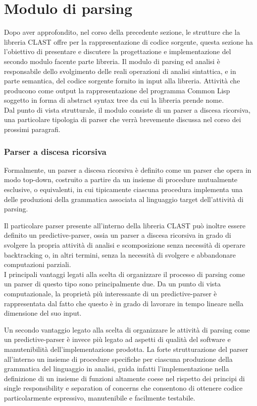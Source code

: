 \section{Modulo di parsing}

Dopo aver approfondito, nel corso della precedente sezione, le strutture che
la libreria CLAST offre per la rappresentazione di codice sorgente, questa
sezione ha l’obiettivo di presentare e discutere la progettazione e
implementazione del secondo modulo facente parte libreria. Il modulo di
parsing ed analisi è responsabile dello svolgimento delle reali operazioni di
analisi sintattica, e in parte semantica, del codice sorgente fornito in input
alla libreria. Attività che producono come output la rappresentazione del
programma Common Lisp soggetto in forma di abstract syntax tree da cui la
libreria prende nome.\\

Dal punto di vista strutturale, il modulo consiste di un parser a discesa
ricorsiva, una particolare tipologia di parser che verrà brevemente discussa
nel corso dei prossimi paragrafi.

\subsubsection{Parser a discesa ricorsiva}

Formalmente, un parser a discesa ricorsiva è definito come un parser che opera
in modo top-down, costruito a partire da un insieme di procedure mutualmente
esclusive, o equivalenti, in cui tipicamente ciascuna procedura implementa una
delle produzioni della grammatica associata al linguaggio target dell’attività
di parsing.

Il particolare parser presente all’interno della libreria CLAST può inoltre
essere definito un predictive-parser, ossia un parser a discesa ricorsiva in
grado di svolgere la propria attività di analisi e scomposizione senza
necessità di operare backtracking o, in altri termini, senza la necessità di
svolgere e abbandonare computazioni parziali.\\

I principali vantaggi legati alla scelta di organizzare il processo di parsing
come un parser di questo tipo sono principalmente due. Da un punto di vista
computazionale, la proprietà più interessante di un predictive-parser è
rappresentata dal fatto che questo è in grado di lavorare in tempo lineare
nella dimensione del suo input.

Un secondo vantaggio legato alla scelta di organizzare le attività di parsing
come un predictive-parser è invece più legato ad aspetti di qualità del
software e manutenibilità dell’implementazione prodotta. La forte
strutturazione del parser all'interno un insieme di procedure specifiche per
ciascuna produzione della grammatica del linguaggio in analisi, guida infatti
l’implementazione nella definizione di un insieme di funzioni altamente coese
nel rispetto dei principi di single responsibility e separation of concerns
che consentono di ottenere codice particolarmente espressivo, manutenibile e
facilmente testabile.\\

